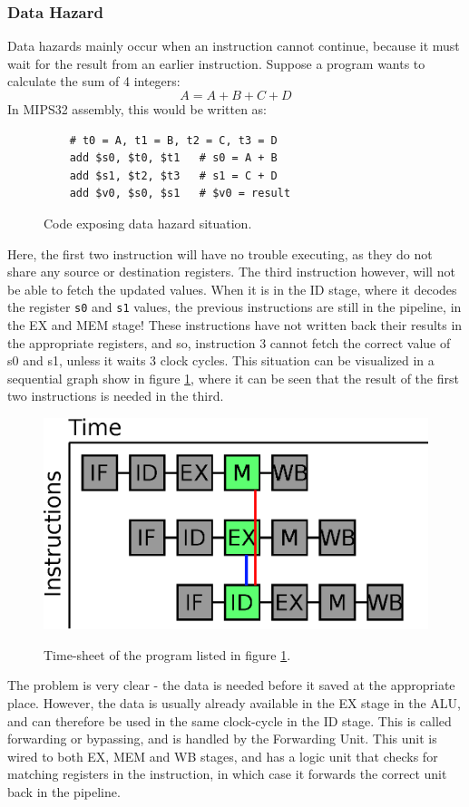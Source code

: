 \subsubsection{Data Hazard}
Data hazards mainly occur when an instruction cannot continue, because it must
wait for the result from an earlier instruction. Suppose a program wants to
calculate the sum of 4 integers:
$$A = A + B + C + D$$
In MIPS32 assembly, this would be written as:
\begin{figure}[H]
	\begin{lstlisting}
	# t0 = A, t1 = B, t2 = C, t3 = D
	add $s0, $t0, $t1 	# s0 = A + B
	add $s1, $t2, $t3	# s1 = C + D
	add $v0, $s0, $s1	# $v0 = result
	\end{lstlisting}
	\caption{Code exposing data hazard situation.}
	\label{fig:data_hazard_code}
\end{figure}
Here, the first two instruction will have no trouble executing, as they do not
share any source or destination registers. The third instruction however, will
not be able to fetch the updated values. When it is in the ID stage, where it decodes the
register \texttt{s0} and \texttt{s1} values, the previous instructions are
still in the pipeline, in the EX and MEM stage! These instructions have not
written back their results in the appropriate registers, and so, instruction 3
cannot fetch the correct value of s0 and s1, unless it waits 3 clock
cycles. This situation can be visualized in a sequential graph show in figure
\ref{fig:data_hazard_code}, where it can be seen that the result of the first
two instructions is needed in the third.\\
\begin{figure}
	\includegraphics[scale=0.4]{pipeline/data_hazard.eps}
	\label{fig:data_hazard}
	\caption{Time-sheet of the program listed in figure
\ref{fig:data_hazard_code}.}
\end{figure}
The problem is very clear - the data is needed before it saved at the
appropriate place. However, the data is usually already available in the EX
stage in the ALU, and can therefore be used in the same clock-cycle in the ID
stage. This is called forwarding or bypassing, and is handled by the
Forwarding Unit. This unit is wired to both EX, MEM and WB stages, and has a
logic unit that checks for matching registers in the instruction, in which case
it forwards the correct unit back in the pipeline.

